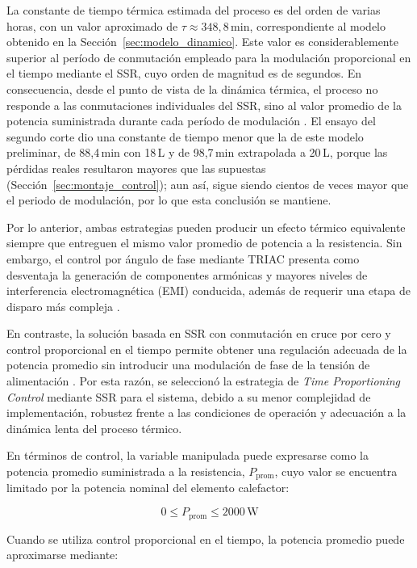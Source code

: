 La constante de tiempo térmica estimada del proceso es del orden de varias horas, con un valor aproximado de $\tau \approx 348{,}8\,\mathrm{min}$, correspondiente al modelo obtenido en la Sección~\ref{sec:modelo_dinamico}. Este valor es considerablemente superior al período de conmutación empleado para la modulación proporcional en el tiempo mediante el SSR, cuyo orden de magnitud es de segundos. En consecuencia, desde el punto de vista de la dinámica térmica, el proceso no responde a las conmutaciones individuales del SSR, sino al valor promedio de la potencia suministrada durante cada período de modulación \cite{ogata2010modern, dorf2021modern}. El ensayo del segundo corte dio una constante de tiempo menor que la de este modelo preliminar, de 88,4\,min con 18\,L y de 98,7\,min extrapolada a 20\,L, porque las pérdidas reales resultaron mayores que las supuestas (Sección~\ref{sec:montaje_control}); aun así, sigue siendo cientos de veces mayor que el periodo de modulación, por lo que esta conclusión se mantiene.

Por lo anterior, ambas estrategias pueden producir un efecto térmico equivalente siempre que entreguen el mismo valor promedio de potencia a la resistencia. Sin embargo, el control por ángulo de fase mediante TRIAC presenta como desventaja la generación de componentes armónicas y mayores niveles de interferencia electromagnética (EMI) conducida, además de requerir una etapa de disparo más compleja \cite{rashid2014power, mohan2007power}.

En contraste, la solución basada en SSR con conmutación en cruce por cero y control proporcional en el tiempo permite obtener una regulación adecuada de la potencia promedio sin introducir una modulación de fase de la tensión de alimentación \cite{rashid2014power}. Por esta razón, se seleccionó la estrategia de \textit{Time Proportioning Control} mediante SSR para el sistema, debido a su menor complejidad de implementación, robustez frente a las condiciones de operación y adecuación a la dinámica lenta del proceso térmico.

En términos de control, la variable manipulada puede expresarse como la potencia promedio suministrada a la resistencia, $P_{\mathrm{prom}}$, cuyo valor se encuentra limitado por la potencia nominal del elemento calefactor:


\begin{equation}
0 \leq P_{\mathrm{prom}} \leq 2000\,\mathrm{W}
\end{equation}

Cuando se utiliza control proporcional en el tiempo, la potencia promedio puede aproximarse mediante:

